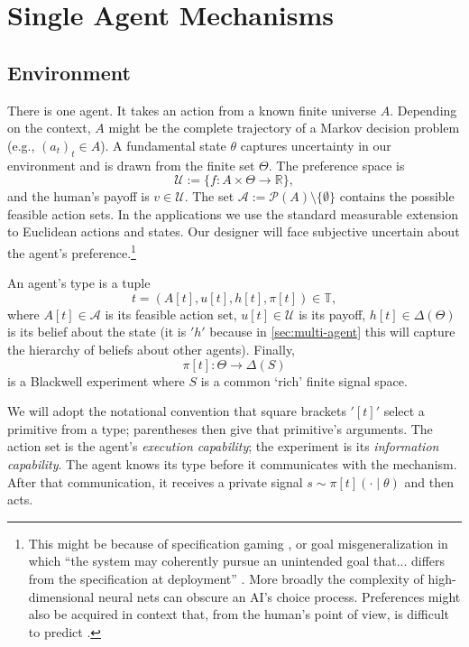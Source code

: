 \documentclass[12pt,reqno]{article}
\theoremstyle{definition} \newtheorem{example}{Example}
\theoremstyle{definition} \newtheorem{condition}{Condition}
\theoremstyle{definition} \newtheorem{corollary}{Corollary}
\theoremstyle{definition} \newtheorem{claim}{Claim}
\theoremstyle{definition} \newtheorem{definition}{Definition}
\theoremstyle{definition} \newtheorem{conjecture}{Conjecture}
\theoremstyle{definition} \newtheorem{Lemma}{Lemma}
\theoremstyle{definition} \newtheorem{lemma}{Lemma}
\theoremstyle{plain} \newtheorem{theorem}{Theorem}
\theoremstyle{definition} \newtheorem{assumption}{Assumption}
\theoremstyle{definition} \newtheorem*{assumptionnonumber}{Assumption}
\theoremstyle{definition} \newtheorem*{theoremNoNumber}{Proposition}
\theoremstyle{definition}\newtheorem{proposition}{Proposition}
\theoremstyle{definition} \newtheorem{observation}{Observation}
\theoremstyle{definition} \newtheorem*{definitionNoNumber}{Definition}
\theoremstyle{definition} \newtheorem{Definition}{Definition}
\theoremstyle{definition} \newtheorem*{DefinitionNoNumber}{Definition}
\theoremstyle{definition} \newtheorem*{fact}{Fact}
\theoremstyle{definition} \newtheorem*{property}{Property}
\theoremstyle{definition} \newtheorem{remark}{Remark}
\theoremstyle{definition}\newtheorem{romanexampleinner}{Example}
\begin{document}
\section{Single Agent Mechanisms}\label{sec:single-agent}

\subsection{Environment}\label{sec:environment}\label{sec:single-agent-environment}

There is one agent. It takes an action from a known finite universe \(A\). Depending on the context, $A$ might be the complete trajectory of a Markov decision problem (e.g., $(a_t)_t \in A$). A fundamental state $\theta$ captures uncertainty in our environment and is drawn from the finite set \(\Theta\). The preference space is
\[
\mathcal U:=\{f:A\times\Theta\to\mathbb R\},
\]
and the human's payoff is \(v\in\mathcal U\). The set \(\mathscr A:=\mathcal P(A)\setminus\{\emptyset\}\) contains the possible feasible action sets. In the applications we use the standard measurable extension to Euclidean actions and states. Our designer will face subjective uncertain about the agent's preference.\footnote{This might be because of specification gaming \citep{krakovna2020specification}, or goal misgeneralization in which ``the system may coherently pursue an unintended goal that... differs from the specification at deployment'' \citep{shah2022goal}. More broadly the complexity of high-dimensional neural nets can obscure an AI's choice process. Preferences might also be acquired in context that, from the human's point of view, is difficult to predict \citep{goldstein2025does}.
} 

An agent's type is a tuple
\[
t=(A[t],u[t],h[t],\pi[t])\in\mathbb T,
\]
where \(A[t]\in\mathscr A\) is its feasible action set, \(u[t]\in\mathcal U\) is its payoff, \(h[t]\in\Delta(\Theta)\) is its belief about the state (it is $'h'$ because in \cref{sec:multi-agent} this will capture the hierarchy of beliefs about other agents). Finally, 
\[
\pi[t]:\Theta\to\Delta(S)
\]
is a Blackwell experiment where \(S\) is a common `rich' finite signal space.

We will adopt the notational convention that square brackets $'[t]'$  select a primitive from a type; parentheses then give that primitive's arguments. The action set is the agent's \emph{execution capability}; the experiment is its \emph{information capability}. The agent knows its type before it communicates with the mechanism. After that communication, it receives a private signal \(s\sim\pi[t](\cdot\mid\theta)\) and then acts. 
\end{document}
